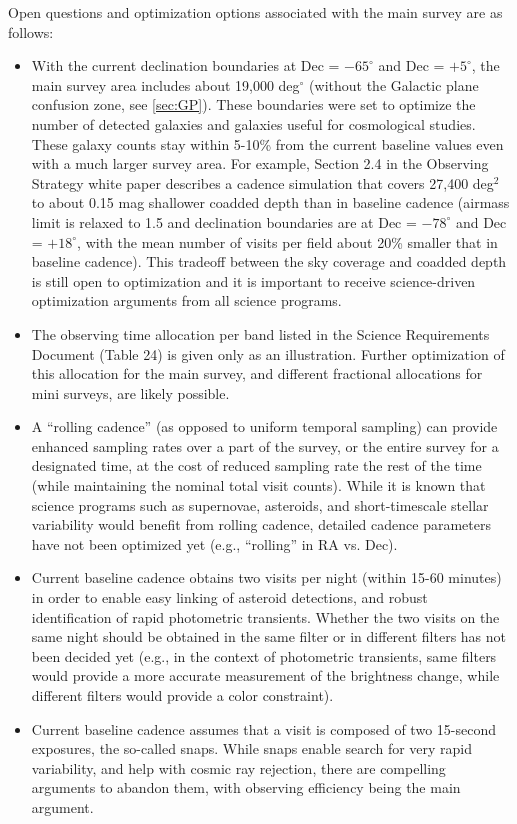 \documentclass[DM,lsstdraft,toc,usenatbib]{lsstdoc}
\begin{document}
Open questions and optimization options associated with the main survey are as follows: 
\begin{itemize}
\item With the current declination boundaries at Dec = $-65^\circ$ and Dec = $+5^\circ$,
the main survey area includes about 19,000 deg$^\circ$ (without the Galactic plane 
confusion zone, see \ref{sec:GP}). These boundaries were set to optimize the number of
detected galaxies and galaxies useful for cosmological studies. These galaxy counts 
stay within 5-10\% from the current baseline values even with a much larger survey area. 
For example, Section 2.4 in the Observing Strategy white paper describes a cadence simulation 
that covers 27,400 deg$^2$ to about 0.15 mag shallower coadded depth than in baseline 
cadence (airmass limit is relaxed to 1.5 and declination boundaries are at Dec = $-78^\circ$ 
and Dec = $+18^\circ$, with the mean number of visits per field about 20\% smaller that
in baseline cadence). This tradeoff between the sky coverage and coadded depth is still
open to optimization and it is important to receive science-driven optimization arguments
from all science programs. 
\item The observing time allocation per band listed in the Science Requirements Document
(Table 24) is given only as an illustration. Further optimization of this allocation for the main 
survey, and different fractional allocations for mini surveys, are likely possible. 
\item A ``rolling cadence'' (as opposed to uniform temporal sampling) can provide enhanced
sampling rates over a part of the survey, or the entire survey for a designated time, at the
cost of reduced sampling rate the rest of the time (while maintaining the nominal total 
visit counts). While it is known that science programs such as supernovae, asteroids, and
short-timescale stellar variability would benefit from rolling cadence, detailed cadence
parameters have not been optimized yet (e.g., ``rolling'' in RA vs. Dec). 
\item Current baseline cadence obtains two visits per night (within 15-60 minutes) in 
order to enable easy linking of asteroid detections, and robust identification of rapid 
photometric transients. Whether the two visits on the same night should be obtained 
in the same filter or in different filters has not been decided yet (e.g., in the context
of photometric transients, same filters would provide a more accurate measurement
of the brightness change, while different filters would provide a color constraint). 
\item Current baseline cadence assumes that a visit is composed of two 15-second
exposures, the so-called snaps. While snaps enable search for very rapid variability,
and help with cosmic ray rejection, there are compelling arguments to abandon
them, with observing efficiency being the main argument. 
\end{itemize}
\end{document}
